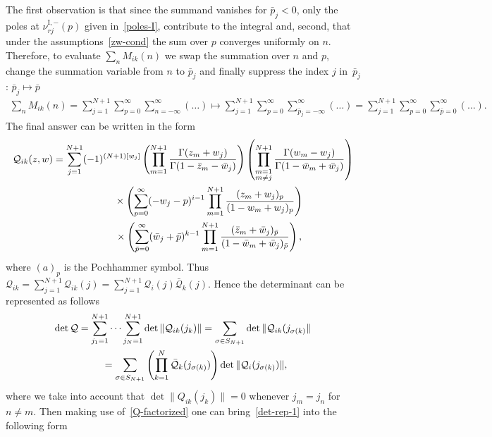 \documentclass[pdftex]{sigma}
\numberwithin{equation}{section}
\begin{document}
The first observation is that since the summand vanishes for $\bar p_j < 0$, only the poles at
$\nu^{\mathrm{I},-}_{rj}(p)$ given in~\eqref{poles-I}, contribute to the integral and, second, that under the
assumptions~\eqref{zw-cond} the sum over $p$ converges uniformly on $n$. Therefore, to evaluate $\sum_n M_{ik}(n)$ we
swap the summation over $n$ and $p$, change the summation variable from $n$ to $\bar p_j$ and finally suppress the
index $j$ in~$\bar p_j$: $\bar p_j\mapsto \bar p$
\begin{gather*}
\sum_n M_{ik}(n)=\sum_{j=1}^{N+1}\sum_{p= 0}^{\infty} \sum_{n=-\infty}^{\infty}( \ldots )
\mapsto \sum_{j=1}^{N+1}\sum_{p= 0}^{\infty}
\sum_{\bar p_j=-\infty}^{\infty}( \ldots ) =\sum_{j=1}^{N+1}\sum_{p= 0}^{\infty}
\sum_{\bar p =0}^{\infty}( \ldots ).
\end{gather*}
The final answer can be written in the form
\begin{gather}
\mathcal Q_{ik}(z,w) =\sum_{j=1}^{N+1} (-1)^{(N+1)[w_j]}
\left(\prod_{m=1}^{N+1}\frac{\Gamma(z_m+w_{j})}{\Gamma(1-\bar z_m-\bar w_{j})}\right)\left(
\prod_{\substack{m=1\\ m\neq j}}^{ N+1}\frac{ \Gamma(w_m-w_{j})}{\Gamma(1-\bar w_m+\bar w_{j})}\right)\notag\\
\hphantom{\mathcal Q_{ik}(z,w)=}{} \times
\left(\sum_{p=0}^{\infty} (-w_{j}-p)^{i-1}\prod_{m=1}^{N+1}
\frac{(z_m+w_{j})_{p}}{(1-w_m+w_{j})_{p}}\right)\nonumber\\
\hphantom{\mathcal Q_{ik}(z,w)=}{} \times
\left(\sum_{\bar p=0}^{\infty}(\bar w_{j} + \bar p)^{k-1}\prod_{m=1}^{N+1}
\frac{(\bar z_m+\bar w_{j})_{\bar p}}{(1-\bar w_m+\bar w_{j})_{\bar p}}\right) , \label{Q-factorized}
\end{gather}
where $(a)_p$ is the Pochhammer symbol. Thus $\mathcal Q_{ik}=\sum\limits_{j=1}^{N+1} \mathcal Q_{ik}(j)= \sum\limits_{j=1}^{N+1} \mathcal Q_{i}(j)\bar{\mathcal Q}_k(j)$. Hence the determinant can be represented as follows
\begin{gather*}
\det\mathcal Q =\sum_{j_1=1}^{N+1}\cdots \sum_{j_N=1}^{N+1}
\det\|\mathcal Q_{ik}(j_k)\| =\sum_{\sigma\in S_{N+1}}
\det \| \mathcal Q_{ik}(j_{\sigma(k)}\|
\notag\\
\hphantom{\det\mathcal Q}{} =\sum_{\sigma\in S_{N+1}} \left(\prod_{k=1}^N\bar{\mathcal Q}_k(j_{\sigma(k)})\right)
\det\| \mathcal Q_{i}(j_{\sigma(k)})\|,
\end{gather*}
where we take into account that $\det\|Q_{ik}(j_k)\|=0$ whenever $j_{m}=j_n$ for $n\neq m$. Then making use of~\eqref{Q-factorized} one can bring~\eqref{det-rep-1} into the following form
\end{document}
